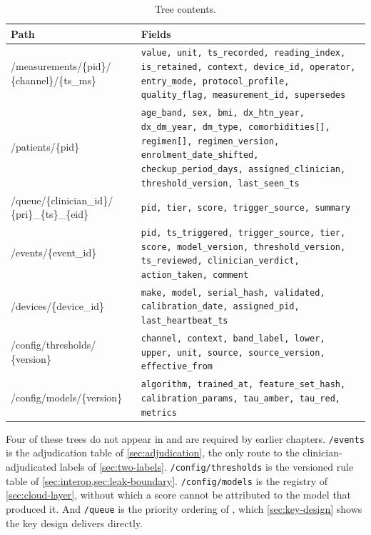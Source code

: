 \documentclass[12pt,a4paper,oneside]{report}
\begin{document}
\begin{table}[htbp]
\centering\footnotesize
\caption{Tree contents.}\label{tab:tree-contents}
\begin{tabularx}{\textwidth}{@{}>{\raggedright\arraybackslash\ttfamily\scriptsize}p{4.0cm} X@{}}
\toprule
\normalfont\textbf{Path} & \textbf{Fields} \\
\midrule
/measurements/\{pid\}/ \{channel\}/\{ts\_ms\} &
\texttt{value, unit, ts\_recorded, reading\_index, is\_retained, context, device\_id, operator, entry\_mode, protocol\_profile, quality\_flag, measurement\_id, supersedes} \\
\addlinespace
/patients/\{pid\} &
\texttt{age\_band, sex, bmi, dx\_htn\_year, dx\_dm\_year, dm\_type, comorbidities[], regimen[], regimen\_version, enrolment\_date\_shifted, checkup\_period\_days, assigned\_clinician, threshold\_version, last\_seen\_ts} \\
\addlinespace
/queue/\{clinician\_id\}/ \{pri\}\_\{ts\}\_\{eid\} &
\texttt{pid, tier, score, trigger\_source, summary} \\
\addlinespace
/events/\{event\_id\} &
\texttt{pid, ts\_triggered, trigger\_source, tier, score, model\_version, threshold\_version, ts\_reviewed, clinician\_verdict, action\_taken, comment} \\
\addlinespace
/devices/\{device\_id\} &
\texttt{make, model, serial\_hash, validated, calibration\_date, assigned\_pid, last\_heartbeat\_ts} \\
\addlinespace
/config/thresholds/ \{version\} &
\texttt{channel, context, band\_label, lower, upper, unit, source, source\_version, effective\_from} \\
\addlinespace
/config/models/\{version\} &
\texttt{algorithm, trained\_at, feature\_set\_hash, calibration\_params, tau\_amber, tau\_red, metrics} \\
\bottomrule
\end{tabularx}
\end{table}

Four of these trees do not appear in \textcite{efendi2025} and are required by earlier chapters. \texttt{/events} is the adjudication table of \cref{sec:adjudication}, the only route to the clinician-adjudicated labels of \cref{sec:two-labels}. \texttt{/config/thresholds} is the versioned rule table of \cref{sec:interop,sec:leak-boundary}. \texttt{/config/models} is the registry of \cref{sec:cloud-layer}, without which a score cannot be attributed to the model that produced it. And \texttt{/queue} is the priority ordering of \textcite{yazdani2018}, which \cref{sec:key-design} shows the key design delivers directly.
\end{document}
